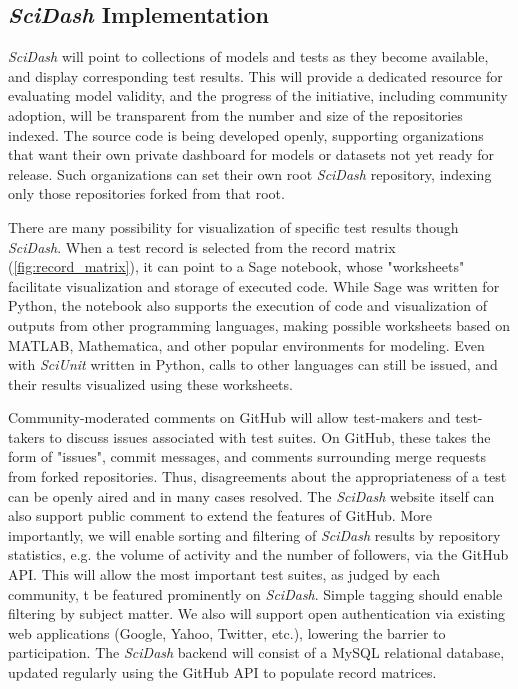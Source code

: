 \documentclass[11pt,letterpaper]{article}
\begin{document}
\subsection{\textit{SciDash} Implementation}
\textit{SciDash} will point to collections of models and tests as they become available, and display corresponding test results.  This will provide a dedicated resource for evaluating model validity, and the progress of the initiative, including community adoption, will be transparent from the number and size of the repositories indexed.  The source code is being developed openly\cite{scidash_portal_repo_url}, supporting organizations that want their own private dashboard for models or datasets not yet ready for release.  Such organizations can set their own root \textit{SciDash} repository, indexing only those repositories forked from that root.  

There are many possibility for visualization of specific test results though \textit{SciDash}.  When a test record is selected from the record matrix (\ref{fig:record_matrix}), it can point to a Sage notebook\cite{sagenb_url}, whose "worksheets" facilitate visualization and storage of executed code.  While Sage was written for Python, the notebook also supports the execution of code and visualization of outputs from other programming languages, making possible worksheets based on MATLAB, Mathematica, and other popular environments for modeling.  Even with \textit{SciUnit} written in Python, calls to other languages can still be issued, and their results visualized using these worksheets.

Community-moderated comments on GitHub will allow test-makers and test-takers to discuss issues associated with test suites.  On GitHub, these takes the form of "issues", commit messages, and comments surrounding merge requests from forked repositories.  Thus, disagreements about the appropriateness of a test can be openly aired and in many cases resolved.  The \textit{SciDash} website itself can also support public comment to extend the features of GitHub.  More importantly, we will enable sorting and filtering of \textit{SciDash} results by repository statistics, e.g. the volume of activity and the number of followers, via the GitHub API.  This will allow the most important test suites, as judged by each community, t be featured prominently on \textit{SciDash}.  Simple tagging should enable filtering by subject matter.  We also will support open authentication via existing web applications (Google, Yahoo, Twitter, etc.), lowering the barrier to participation.  The \textit{SciDash} backend will consist of a MySQL relational database, updated regularly using the GitHub API to populate record matrices.  
\end{document}
